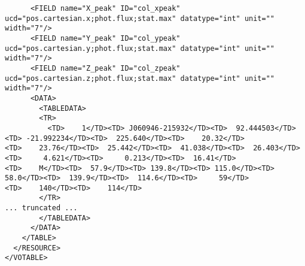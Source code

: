 {\begin{verbatim}
      <FIELD name="X_peak" ID="col_xpeak" ucd="pos.cartesian.x;phot.flux;stat.max" datatype="int" unit="" width="7"/>
      <FIELD name="Y_peak" ID="col_ypeak" ucd="pos.cartesian.y;phot.flux;stat.max" datatype="int" unit="" width="7"/>
      <FIELD name="Z_peak" ID="col_zpeak" ucd="pos.cartesian.z;phot.flux;stat.max" datatype="int" unit="" width="7"/>
      <DATA>
        <TABLEDATA>
        <TR>
          <TD>    1</TD><TD> J060946-215932</TD><TD>  92.444503</TD><TD> -21.992234</TD><TD>  225.640</TD><TD>    20.32</TD>
<TD>    23.76</TD><TD>  25.442</TD><TD>  41.038</TD><TD>  26.403</TD><TD>     4.621</TD><TD>     0.213</TD><TD>  16.41</TD>
<TD>    M</TD><TD>  57.9</TD><TD> 139.8</TD><TD> 115.0</TD><TD>   58.0</TD><TD>  139.9</TD><TD>  114.6</TD><TD>     59</TD>
<TD>    140</TD><TD>    114</TD>
        </TR>
... truncated ...
        </TABLEDATA>
      </DATA>
    </TABLE>
  </RESOURCE>
</VOTABLE>
  \end{verbatim}
}


